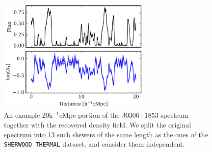 \begin{figure}[h!]
    \centering
    \includegraphics[width=7.5cm]{img/ML/ghost_recovered.png}
    \caption{An example 20h$^{-1}$cMpc portion of the J0306+1853 spectrum together with the recovered density field. We split the original spectrum into 13 such skewers of the same length as the ones of the \texttt{SHERWOOD THERMAL} dataset, and consider them independent.}
    \label{fig: ghost rec}
\end{figure}


